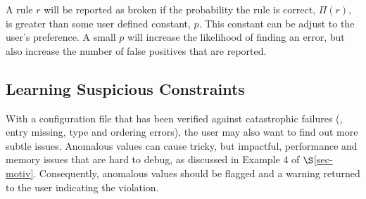 




A rule $r$ will be reported as broken if the probability the rule is
correct, $\Pi(r)$, is greater than some user defined constant, $p$. This
constant can be adjust to the user's preference. A small $p$ will
increase the likelihood of finding an error, but also increase the
number of false positives that are reported.



\subsection{Learning Suspicious Constraints}
\label{subsec-constraints}

With a configuration file that has been verified against catastrophic
failures (\eg, entry missing, type and ordering errors), 
the user may also want to find out more subtle issues.
Anomalous values can cause tricky, but impactful, performance and memory
issues that are hard to debug, as discussed in Example 4 of 
$\S$\ref{sec-motiv}. 
Consequently, anomalous values should be flagged and a warning returned
to the user indicating the violation.

